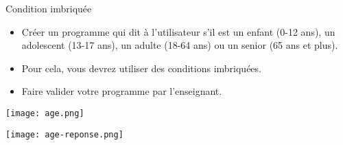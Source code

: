 \begin{UPSTIManipulation}{Condition imbriquée}
    \begin{itemize}[label=$\square$]
        \item Créer un programme qui dit à l'utilisateur s'il est un enfant (0-12 ans), un adolescent (13-17 ans), un adulte (18-64 ans) ou un senior (65 ans et plus).
        \item Pour cela, vous devrez utiliser des conditions imbriquées.
        \item Faire valider votre programme par l'enseignant.
    \end{itemize}
    \begin{minipage}{.5\textwidth}
        \begin{center}
            \texttt{[image: age.png]}
        \end{center}
    \end{minipage}\hfill
    \begin{minipage}{.5\textwidth}
        \begin{center}
            \texttt{[image: age-reponse.png]}
        \end{center}
    \end{minipage}
\end{UPSTIManipulation}